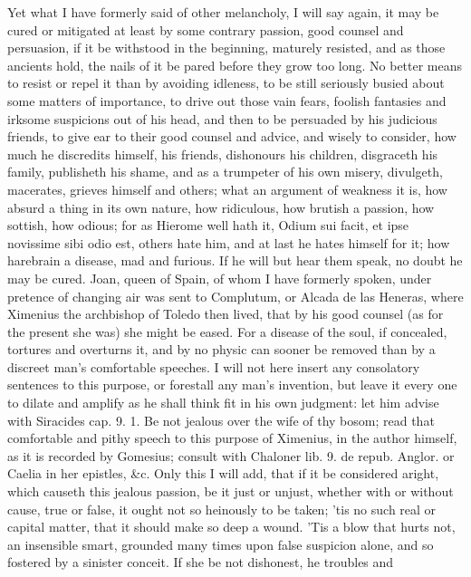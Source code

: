 {Yet what I have formerly said of other melancholy, I will say again, it
may be cured or mitigated at least by some contrary passion, good
counsel and persuasion, if it be withstood in the beginning, maturely
resisted, and as those ancients hold, the nails of it be pared
before they grow too long. No better means to resist or repel it than
by avoiding idleness, to be still seriously busied about some matters
of importance, to drive out those vain fears, foolish fantasies and
irksome suspicions out of his head, and then to be persuaded by his
judicious friends, to give ear to their good counsel and advice, and
wisely to consider, how much he discredits himself, his friends,
dishonours his children, disgraceth his family, publisheth his shame,
and as a trumpeter of his own misery, divulgeth, macerates, grieves
himself and others; what an argument of weakness it is, how absurd a
thing in its own nature, how ridiculous, how brutish a passion, how
sottish, how odious; for as Hierome well hath it, Odium sui
facit, et ipse novissime sibi odio est, others hate him, and at last he
hates himself for it; how harebrain a disease, mad and furious. If he
will but hear them speak, no doubt he may be cured. Joan, queen
of Spain, of whom I have formerly spoken, under pretence of changing
air was sent to Complutum, or Alcada de las Heneras, where Ximenius the
archbishop of Toledo then lived, that by his good counsel (as for the
present she was) she might be eased. For a disease of the soul,
if concealed, tortures and overturns it, and by no physic can sooner be
removed than by a discreet man's comfortable speeches. I will not here
insert any consolatory sentences to this purpose, or forestall any
man's invention, but leave it every one to dilate and amplify as he
shall think fit in his own judgment: let him advise with Siracides cap.
9. 1. Be not jealous over the wife of thy bosom; read that comfortable
and pithy speech to this purpose of Ximenius, in the author himself, as
it is recorded by Gomesius; consult with Chaloner lib. 9. de repub.
Anglor. or Caelia in her epistles, \&c. Only this I will add, that if it
be considered aright, which causeth this jealous passion, be it just or
unjust, whether with or without cause, true or false, it ought not so
heinously to be taken; 'tis no such real or capital matter, that it
should make so deep a wound. 'Tis a blow that hurts not, an insensible
smart, grounded many times upon false suspicion alone, and so fostered
by a sinister conceit. If she be not dishonest, he troubles and
}
